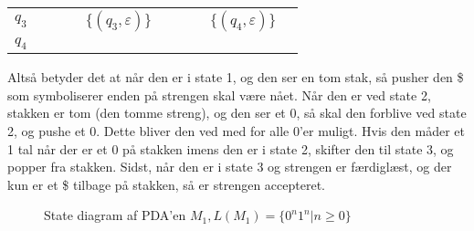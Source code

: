 \begin{definition}
\begin{example}[$\{0^{n}1^{n} | n \ge 0\}$]
\begin{enumerate}
\begin{center}
\begin{table}[ht]
\begin{tabular}{l|lllllllll}
$q_3$                                                                   &                        &                         &                                    & $\{(q_3, \varepsilon)\}$ &                         &                                    &                        & $\{(q_4, \varepsilon)\}$ &                                    \\ \cline{1-1}
$q_4$                                                                   &                        &                         &                                    &                          &                         &                                    &                        &                          &                                    \\ \cline{1-1}
\end{tabular}
\end{table}
          \end{center}
  \end{enumerate}
          Altså betyder det at når den er i state 1, og den ser en tom stak, så pusher den \$ som symboliserer enden på strengen skal være nået. Når den er ved state 2, stakken er tom (den tomme streng), og den ser et 0, så skal den forblive ved state 2, og pushe et 0. Dette bliver den ved med for alle 0'er muligt. Hvis den måder et 1 tal når der er et 0 på stakken imens den er i state 2, skifter den til state 3, og popper fra stakken. Sidst, når den er i state 3 og strengen er færdiglæst, og der kun er et \$ tilbage på stakken, så er strengen accepteret.

          \begin{figure}[ht]
            \centering
            \caption{\label{fig:sipser2.15} State diagram af PDA'en $M_1, L(M_1) = \{0^n 1^n  | n \ge 0 \}$}
          \end{figure}



\end{example}
\end{definition}
